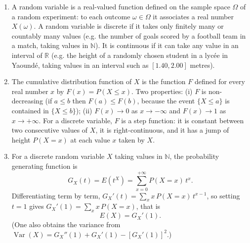 \documentclass[11pt]{article}
\newcommand{\cle}[1]{{\popxbold\color{popdark}#1}}
\begin{document}
\begin{corrige}
\begin{enumerate}
\item A \cle{random variable} is a real-valued function defined on the sample space $\Omega$ of a random experiment: to each outcome $\omega \in \Omega$ it associates a real number $X(\omega)$. A random variable is \cle{discrete} if it takes only finitely many or countably many values (e.g. the number of goals scored by a football team in a match, taking values in $\mathbb{N}$). It is \cle{continuous} if it can take any value in an interval of $\mathbb{R}$ (e.g. the height of a randomly chosen student in a lycée in Yaoundé, taking values in an interval such as $[1.40, 2.00]$ metres).
\item The \cle{cumulative distribution function} of $X$ is the function $F$ defined for every real number $x$ by $F(x) = P(X \le x)$. Two properties: (i) $F$ is non-decreasing (if $a \le b$ then $F(a) \le F(b)$, because the event $\{X \le a\}$ is contained in $\{X \le b\}$); (ii) $F(x) \to 0$ as $x \to -\infty$ and $F(x) \to 1$ as $x \to +\infty$. For a discrete variable, $F$ is a step function: it is constant between two consecutive values of $X$, it is right-continuous, and it has a jump of height $P(X=x)$ at each value $x$ taken by $X$.
\item For a discrete random variable $X$ taking values in $\mathbb{N}$, the \cle{probability generating function} is
\[ G_X(t) = E(t^X) = \sum_{x=0}^{+\infty} P(X = x)\, t^x. \]
Differentiating term by term, $G_X'(t) = \sum_x x\, P(X=x)\, t^{x-1}$, so setting $t = 1$ gives $G_X'(1) = \sum_x x\,P(X=x)$, that is
\[ E(X) = G_X'(1). \]
(One also obtains the variance from $\operatorname{Var}(X) = G_X''(1) + G_X'(1) - [G_X'(1)]^2$.)
\end{enumerate}
\end{corrige}
\end{document}
